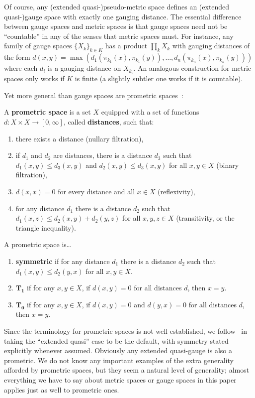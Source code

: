 \documentclass{article}
\def\Rp{[0,\infty]}
\begin{document}
Of course, any (extended quasi-)pseudo-metric space defines an (extended quasi-)gauge space with exactly one gauging distance.
The essential difference between gauge spaces and metric spaces is that gauge spaces need not be ``countable'' in any of the senses that metric spaces must.
For instance, any family of gauge spaces $\{X_k\}_{k\in K}$ has a product $\prod_k X_k$ with gauging distances of the form $d(x,y) = \max(d_1(\pi_{k_1}(x),\pi_{k_1}(y)),\dots,d_n(\pi_{k_n}(x),\pi_{k_n}(y)))$ where each $d_i$ is a gauging distance on $X_{k_i}$.
An analogous construction for metric spaces only works if $K$ is finite (a slightly subtler one works if it is countable).

Yet more general than gauge spaces are prometric spaces~\cite{cht:one-setting}:

\begin{defn}
  A \textbf{prometric space} is a set $X$ equipped with a set of functions $d:X\times X\to\Rp$, called \textbf{distances}, such that:
  \begin{enumerate}
  \item there exists a distance (nullary filtration),
  \item if $d_1$ and $d_2$ are distances, there is a distance $d_3$ such that $d_1(x,y)\le d_3(x,y)$ and $d_2(x,y)\le d_3(x,y)$ for all $x,y\in X$ (binary filtration),
  \item $d(x,x)=0$ for every distance and all $x\in X$ (reflexivity),
  \item for any distance $d_1$ there is a distance $d_2$ such that $d_1(x,z)\le d_2(x,y)+d_2(y,z)$ for all $x,y,z\in X$ (transitivity, or the triangle inequality).
  \end{enumerate}
  A prometric space is\dots
  \begin{enumerate}[resume]
  \item \textbf{symmetric} if for any distance $d_1$ there is a distance $d_2$ such that $d_1(x,y)\le d_2(y,x)$ for all $x,y\in X$.
  \item $\mathbf{T_1}$ if for any $x,y\in X$, if $d(x,y)=0$ for all distances $d$, then $x=y$.
  \item $\mathbf{T_0}$ if for any $x,y\in X$, if $d(x,y)=0$ and $d(y,x)=0$ for all distances $d$, then $x=y$.
  \end{enumerate}
\end{defn}

Since the terminology for prometric spaces is not well-established, we follow~\cite{cht:one-setting} in taking the ``extended quasi'' case to be the default, with symmetry stated explicitly whenever assumed.
Obviously any extended quasi-gauge is also a prometric.
We do not know any important examples of the extra generality afforded by prometric spaces, but they seem a natural level of generality; almost everything we have to say about metric spaces or gauge spaces in this paper applies just as well to prometric ones.
\end{document}
